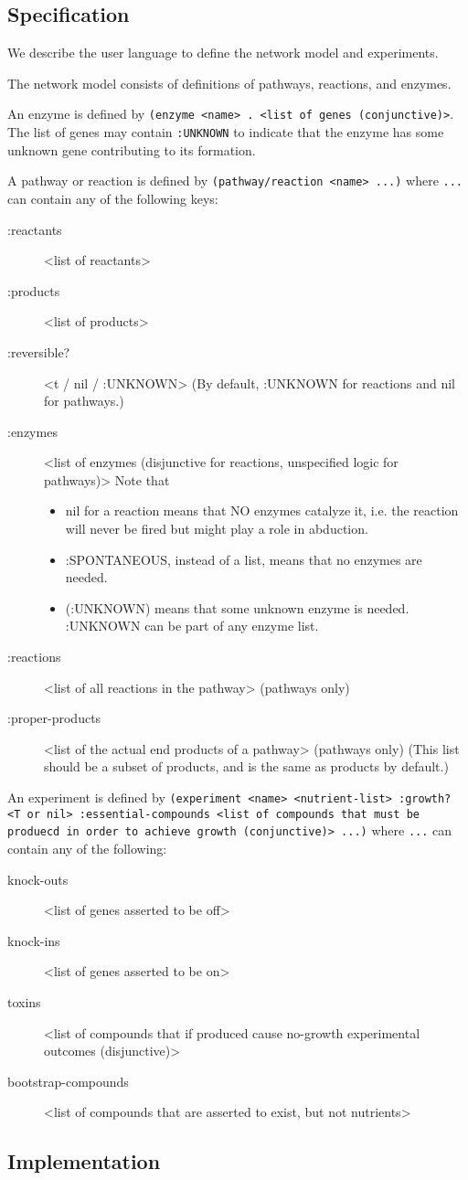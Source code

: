 \subsection{Specification}

We describe the user language to define the network model and experiments.

The network model consists of definitions of pathways, reactions, and enzymes.

An enzyme is defined by {\small\tt (enzyme <name> . <list of genes
(conjunctive)>}. The list of genes may contain {\small\tt :UNKNOWN} to
indicate that the enzyme has some unknown gene contributing to its
formation.

A pathway or reaction is defined by
{\small\tt (pathway/reaction <name> ...)} where {\small\tt ...} can contain any of the following keys:
\begin{description}
\item[:reactants] <list of reactants>
\item[:products] <list of products>
\item[:reversible?] <t / nil / :UNKNOWN> (By default, :UNKNOWN for reactions and nil for pathways.)
\item[:enzymes] <list of enzymes (disjunctive for reactions, unspecified logic for pathways)>
Note that
\begin{itemize}
\item nil for a reaction means that NO enzymes catalyze it, i.e. the reaction will never be fired but might play a role in abduction.
\item :SPONTANEOUS, instead of a list, means that no enzymes are needed.
\item (:UNKNOWN) means that some unknown enzyme is needed. :UNKNOWN can be part of any enzyme list.
\end{itemize}
\item[:reactions] <list of all reactions in the pathway> (pathways only)
\item[:proper-products] <list of the actual end products of a pathway> (pathways only) (This list should be a subset of products, and is the same as products by default.)
\end{description}

An experiment is defined by {\small\tt (experiment <name>
<nutrient-list> :growth? <T or nil> :essential-compounds <list of
compounds that must be produecd in order to achieve growth
(conjunctive)> ...)} where {\small\tt ...} can contain any of the
following:
\begin{description}
\item[knock-outs] <list of genes asserted to be off>
\item[knock-ins] <list of genes asserted to be on>
\item[toxins] <list of compounds that if produced cause no-growth experimental outcomes (disjunctive)>
\item[bootstrap-compounds] <list of compounds that are asserted to exist, but not nutrients>
\end{description}

\subsection{Implementation}
